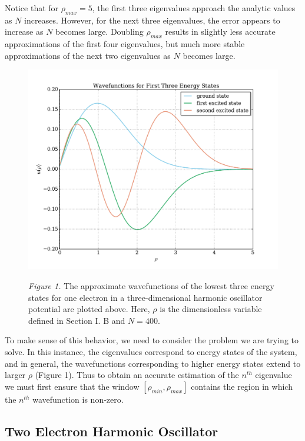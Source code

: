 \documentclass[prb,aps,twocolumn,showpacs,10pt]{revtex4-1}
\begin{document}
Notice that for $\rho_{max}=5$, the first three eigenvalues approach the analytic values as $N$ increases. However, for the next three eigenvalues, the error appears to increase as $N$ becomes large. Doubling $\rho_{max}$ results in slightly less accurate approximations of the first four eigenvalues, but much more stable approximations of the next two eigenvalues as $N$ becomes large.
\begin{center}
\begin{figure}
\includegraphics[scale=0.6]{wvfunc_1e.pdf}

\textit{Figure 1.} The approximate wavefunctions of the lowest three energy states for one electron in a three-dimensional harmonic oscillator potential are plotted above. Here, $\rho$ is the dimensionless variable defined in Section I. B and $N=400$.
\end{figure}
\end{center}
To make sense of this behavior, we need to consider the problem we are trying to solve. In this instance, the eigenvalues correspond to energy states of the system, and in general, the wavefunctions corresponding to higher energy states extend to larger $\rho$ (Figure 1). Thus to obtain an accurate estimation of the $n^{th}$ eigenvalue we must first ensure that the window $\left[ \rho_{min},\rho_{max} \right]$ contains the region in which the $n^{th}$ wavefunction is non-zero. 

\subsection{Two Electron Harmonic Oscillator}
\end{document}
